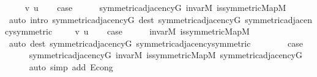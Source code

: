 \begin{isabellebody}
\isanewline
\ \ \isamarkupfalse%
\ {\isacharparenleft}{\kern0pt}{}\ v\ u{\isacharparenright}{\kern0pt}\isanewline
\ \ \isamarkupfalse%
\ {\isacharquery}{\kern0pt}case\isanewline
\ \ \ \ \isamarkupfalse%
\ symmetric{\isacharunderscore}{\kern0pt}adjacency{\isacharunderscore}{\kern0pt}G\ invar{\isacharunderscore}{\kern0pt}M\ is{\isacharunderscore}{\kern0pt}symmetric{\isacharunderscore}{\kern0pt}Map{\isacharunderscore}{\kern0pt}M\isanewline
\ \ \ \ \isamarkupfalse%
\ {\isacharparenleft}{\kern0pt}auto\ intro{\isacharcolon}{\kern0pt}\ symmetric{\isacharunderscore}{\kern0pt}adjacency{\isacharunderscore}{\kern0pt}G{}\ dest{\isacharcolon}{\kern0pt}\ symmetric{\isacharunderscore}{\kern0pt}adjacency{\isacharunderscore}{\kern0pt}G{}\ symmetric{\isacharunderscore}{\kern0pt}adjacency{\isachardot}{\kern0pt}symmetric{\isacharparenright}{\kern0pt}\isanewline
{}\isamarkupfalse%
\isanewline
\ \ \isamarkupfalse%
\ {\isacharparenleft}{\kern0pt}{}\ v\ u{\isacharparenright}{\kern0pt}\isanewline
\ \ \isamarkupfalse%
\ {\isacharquery}{\kern0pt}case\isanewline
\ \ \ \ \isamarkupfalse%
\ invar{\isacharunderscore}{\kern0pt}M\ is{\isacharunderscore}{\kern0pt}symmetric{\isacharunderscore}{\kern0pt}Map{\isacharunderscore}{\kern0pt}M\isanewline
\ \ \ \ \isamarkupfalse%
\ {\isacharparenleft}{\kern0pt}auto\ dest{\isacharcolon}{\kern0pt}\ symmetric{\isacharunderscore}{\kern0pt}adjacency{\isacharunderscore}{\kern0pt}G{}\ symmetric{\isacharunderscore}{\kern0pt}adjacency{\isachardot}{\kern0pt}symmetric{\isacharparenright}{\kern0pt}\isanewline
{}\isamarkupfalse%
\isanewline
\ \ \isamarkupfalse%
\ {}\isanewline
\ \ \isamarkupfalse%
\ {\isacharquery}{\kern0pt}case\isanewline
\ \ \ \ \isamarkupfalse%
\ symmetric{\isacharunderscore}{\kern0pt}adjacency{\isacharunderscore}{\kern0pt}G\ invar{\isacharunderscore}{\kern0pt}M\ is{\isacharunderscore}{\kern0pt}symmetric{\isacharunderscore}{\kern0pt}Map{\isacharunderscore}{\kern0pt}M\ symmetric{\isacharunderscore}{\kern0pt}adjacency{\isacharunderscore}{\kern0pt}G{}\isanewline
\ \ \ \ \isamarkupfalse%
\ {\isacharparenleft}{\kern0pt}auto\ simp\ add{\isacharcolon}{\kern0pt}\ E{}{\isacharunderscore}{\kern0pt}cong{\isacharparenright}{\kern0pt}\isanewline
{}\isamarkupfalse%
\isanewline
\ \ \isamarkupfalse%
\ {}\isanewline

\end{isabellebody}
